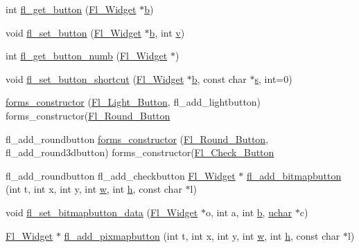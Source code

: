 \begin{DoxyCompactItemize}
\item 
int \hyperlink{forms_8_h_a83d5abbeec6c312f7e552a0fc9e7bc00}{fl\+\_\+get\+\_\+button} (\hyperlink{class_fl___widget}{Fl\+\_\+\+Widget} $\ast$\hyperlink{forms_8_h_a0ba06a290a384fa06b1b90745827dae2}{b})
\item 
void \hyperlink{forms_8_h_a162d15ac28a1d102fca06513d30e54b0}{fl\+\_\+set\+\_\+button} (\hyperlink{class_fl___widget}{Fl\+\_\+\+Widget} $\ast$\hyperlink{forms_8_h_a0ba06a290a384fa06b1b90745827dae2}{b}, int \hyperlink{forms_8_h_a3b90d5a73541ab9402511d87bed076ef}{v})
\item 
int \hyperlink{forms_8_h_a0fa9f1416ea2f7745ef1bf7ecb16a6fd}{fl\+\_\+get\+\_\+button\+\_\+numb} (\hyperlink{class_fl___widget}{Fl\+\_\+\+Widget} $\ast$)
\item 
void \hyperlink{forms_8_h_a073a4a82a4896fcf94d0de82859bd71f}{fl\+\_\+set\+\_\+button\+\_\+shortcut} (\hyperlink{class_fl___widget}{Fl\+\_\+\+Widget} $\ast$\hyperlink{forms_8_h_a0ba06a290a384fa06b1b90745827dae2}{b}, const char $\ast$\hyperlink{forms_8_h_a672b4f0a8c8a6db61068c721f799d87f}{s}, int=0)
\item 
\hyperlink{forms_8_h_ad33f83024690ad4d993522afaff77378}{forms\+\_\+constructor} (\hyperlink{class_fl___light___button}{Fl\+\_\+\+Light\+\_\+\+Button}, fl\+\_\+add\+\_\+lightbutton) forms\+\_\+constructor(\hyperlink{class_fl___round___button}{Fl\+\_\+\+Round\+\_\+\+Button}
\item 
fl\+\_\+add\+\_\+roundbutton \hyperlink{forms_8_h_a2b96f57520543da8426ba73dba546cb5}{forms\+\_\+constructor} (\hyperlink{class_fl___round___button}{Fl\+\_\+\+Round\+\_\+\+Button}, fl\+\_\+add\+\_\+round3dbutton) forms\+\_\+constructor(\hyperlink{class_fl___check___button}{Fl\+\_\+\+Check\+\_\+\+Button}
\item 
fl\+\_\+add\+\_\+roundbutton fl\+\_\+add\+\_\+checkbutton \hyperlink{class_fl___widget}{Fl\+\_\+\+Widget} $\ast$ \hyperlink{forms_8_h_af30b750ee78f00c0550bb39b1309ce08}{fl\+\_\+add\+\_\+bitmapbutton} (int t, int x, int y, int \hyperlink{forms_8_h_aac374e320caaadeca4874add33b62af2}{w}, int \hyperlink{forms_8_h_a7e427ba5b307f9068129699250690066}{h}, const char $\ast$l)
\item 
void \hyperlink{forms_8_h_a30c245b7eb379753842e70c0b6e2476c}{fl\+\_\+set\+\_\+bitmapbutton\+\_\+data} (\hyperlink{class_fl___widget}{Fl\+\_\+\+Widget} $\ast$o, int a, int \hyperlink{forms_8_h_a0ba06a290a384fa06b1b90745827dae2}{b}, \hyperlink{fl__types_8h_a65f85814a8290f9797005d3b28e7e5fc}{uchar} $\ast$c)
\item 
\hyperlink{class_fl___widget}{Fl\+\_\+\+Widget} $\ast$ \hyperlink{forms_8_h_a3221572cadfdb65151af98f2a2d0f441}{fl\+\_\+add\+\_\+pixmapbutton} (int t, int x, int y, int \hyperlink{forms_8_h_aac374e320caaadeca4874add33b62af2}{w}, int \hyperlink{forms_8_h_a7e427ba5b307f9068129699250690066}{h}, const char $\ast$l)

\end{DoxyCompactItemize}
